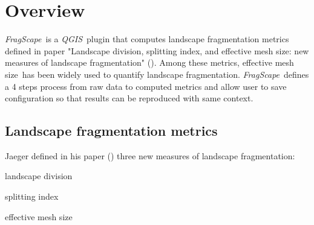 \documentclass[11pt]{article}
\date{\today}
\newcommand{\mycite}[1]{ (\cite{#1})}
\newcommand{\tool}{\emph{FragScape}}
\newcommand{\qgis}{\emph{QGIS}}
\newcommand{\myfigureref}[1]{Figure \ref{#1} : \hyperref[#1]{\nameref{#1}}\dotfill\pageref{#1}}
\newcommand{\meff}{effective mesh size}
\let\tempone\itemize
\let\temptwo\enditemize
\renewenvironment{itemize}{\tempone\addtolength{\itemsep}{-0.5\baselineskip}}{\temptwo}
\begin{document}
\renewcommand{\appendixtocname}{Annexes}
\renewcommand{\appendixpagename}{\color{color1}{Annexes}} 
\sloppy


\vspace{4cm}

\maketitle

\clearpage

\pagestyle{style1}

\setlength{\headsep}{0.9in}

\tableofcontents

\hspace{4cm}







\pagebreak

\section{Overview}

\tool\ is a \qgis\ plugin that computes landscape fragmentation metrics defined in paper "Landscape division, splitting index, and effective mesh size: new measures of landscape fragmentation" \mycite{jaeger}.
Among these metrics, \meff\ has been widely used to quantify landscape fragmentation. \tool\ defines a 4 steps process from raw data to computed metrics and allow user to save configuration so that results can be reproduced with same context.

\subsection{Landscape fragmentation metrics}
\label{sec:metrics}

Jaeger defined in his paper\mycite{jaeger} three new measures of landscape fragmentation:
\begin{itemize}
    \item landscape division
    \item splitting index
    \item effective mesh size
\end{itemize}
\end{document}
